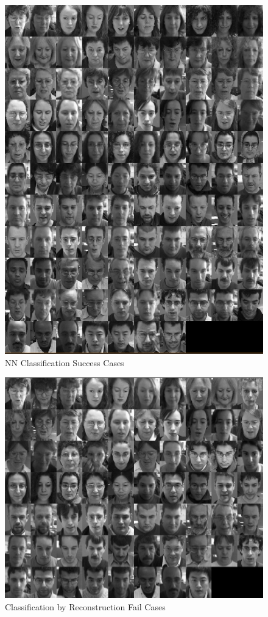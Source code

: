 \documentclass[10pt,technote]{IEEEtran}
\begin{document}
\begin{figure}
    \centering
    \includegraphics[width=\linewidth]{../results/1bb/NN_SUCCESS2.png}
    \caption{NN Classification Success Cases}
    \label{fig:nn_successes}
\end{figure}

\begin{figure}
    \centering
    \includegraphics[width=\linewidth]{../results/1bb/REC_FAIL2.png}
    \caption{Classification by Reconstruction Fail Cases}
    \label{fig:rec_fails}
\end{figure}
\end{document}
